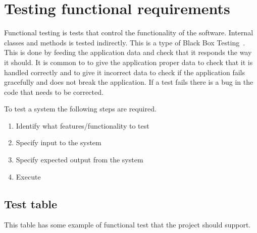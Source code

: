 \section{Testing functional requirements}
\label{sec:funcTest}
Functional testing is tests that control the functionality of the software. Internal classes and methods is tested indirectly. This is a type of Black Box Testing~\cite{blackbox}. This is done by feeding the application data and check that it responds the way it should. It is common to to give the application proper data to check that it is handled correctly and to give it incorrect data to check if the application fails gracefully and does not break the application. If a test fails there is a bug in the code that needs to be corrected.

To test a system the following steps are required.
\begin{enumerate}
\item Identify what features/functionality to test
\item Specify input to the system
\item Specify expected output from the system
\item Execute
\end{enumerate}

\subsection{Test table}
This table has some example of functional test that the project should support.

